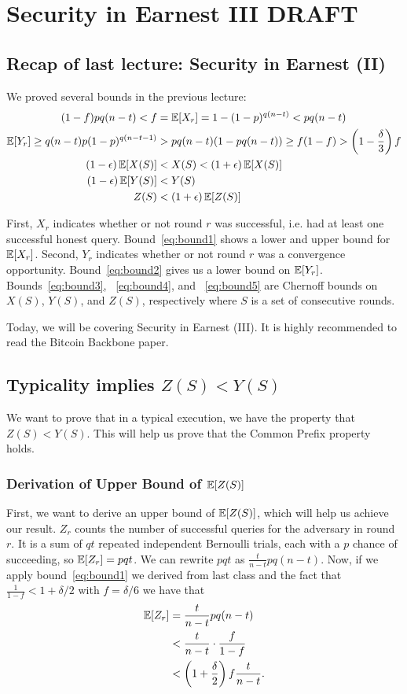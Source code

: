 \chapter{Security in Earnest III \small{\textsf{DRAFT}}}

\section{Recap of last lecture: Security in Earnest (II)}
We proved several bounds in the previous lecture:
\begin{align}
(1-f)pq(n-t) < f &= \operatorname{\mathbb{E}}[X_r] = 1 - (1-p)^{q(n-t)} < pq(n-t)\label{eq:bound1}\\
\operatorname{\mathbb{E}}[Y_r] \geq q(n-t)p(1-p)^{q(n-t-1)} &> pq(n-t)(1-pq(n-t)) \geq f(1-f) > \left(1-\frac{\delta}{3}\right)f \label{eq:bound2}\\
(1-\epsilon)\operatorname{\mathbb{E}}[X(S)] &< X(S) < (1+\epsilon)\operatorname{\mathbb{E}}[X(S)]\label{eq:bound3}\\
 (1-\epsilon)\operatorname{\mathbb{E}}[Y(S)] &< Y(S)\label{eq:bound4}\\
Z(S) &< (1+\epsilon)\operatorname{\mathbb{E}}[Z(S)]\label{eq:bound5}
\end{align}

 First, $X_r$ indicates whether or not round $r$ was successful, i.e. had at least one successful honest query. Bound~\ref{eq:bound1} shows a lower and upper bound for $\mathbb{E}[X_r]$.
 Second, $Y_r$ indicates whether or not round $r$ was a convergence opportunity. Bound~\ref{eq:bound2} gives us a lower bound on $\mathbb{E}[Y_r]$. Bounds~\ref{eq:bound3}, ~\ref{eq:bound4}, and ~\ref{eq:bound5} are Chernoff bounds on $X(S)$, $Y(S)$, and $Z(S)$, respectively where $S$ is a set of consecutive rounds.

 Today, we will be covering Security in Earnest (III). It is highly recommended to read the Bitcoin Backbone paper.

\section{Typicality implies $Z(S) < Y(S)$}
We want to prove that in a typical execution, we have the property that $Z(S) < Y(S)$. This will help us prove that the Common Prefix property holds.

\subsection{Derivation of Upper Bound of $\mathbb{E}[Z(S)]$}
First, we want to derive an upper bound of $\mathbb{E}[Z(S)]$, which will help us achieve our result.
$Z_r$ counts the number of successful queries for the adversary in round $r$. It is a sum of $qt$ repeated independent Bernoulli trials, each with a $p$ chance of succeeding, so $\operatorname{\mathbb{E}}[Z_r] = pqt$. We can rewrite $pqt$ as $\frac{t}{n-t} pq(n-t)$. Now, if we apply bound~\ref{eq:bound1} we derived from last class and the fact that $\frac{1}{1-f} < 1 + \delta/2$ with $f = \delta/6$ we have that
\begin{align}\operatorname{\mathbb{E}}[Z_r] &= \frac{t}{n-t} pq(n-t) \\
&< \frac{t}{n-t} \cdot \frac{f}{1-f}\\
&< \left(1 + \frac{\delta}{2}\right)f \frac{t}{n-t}.\label{eq:zexpupper}
\end{align}

